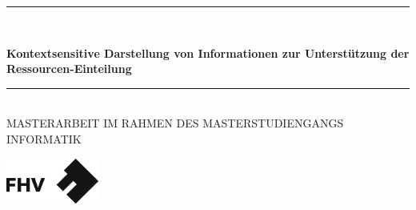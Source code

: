 
\begin{titlepage}




\begin{center}


\newcommand{\HRule}{\rule{\linewidth}{0.5mm}}
\HRule \\[0.4cm]

{ \huge \bfseries Kontextsensitive Darstellung von Informationen zur Unterstützung der Ressourcen-Einteilung}\\ [0.4cm]%
\HRule \\[1cm]

\textsc{\large MASTERARBEIT IM RAHMEN DES
MASTERSTUDIENGANGS INFORMATIK}\\[3cm]



\begin{minipage}{0.48\textwidth}
\begin{center} 
\includegraphics[height=1.5cm]{./img/FHVlogo1}
\end{center}
\end{minipage}
\hfill\\ [0.2cm]




\end{center}
\end{titlepage}
